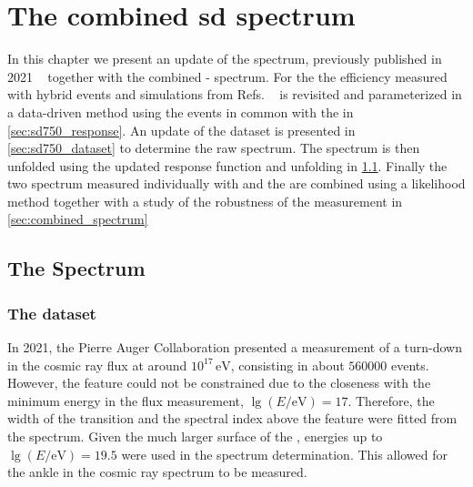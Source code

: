 \documentclass[main.tex]{subfiles}
\begin{document}
\chapter{The combined \gls{sd} spectrum}
\label{chapter:sd750_combined_spectrum}

In this chapter we present an update of the  spectrum, previously published in 2021 ~\cite{PierreAuger:2021:InfillSpectrum} together with the combined - spectrum.
For the  the efficiency measured with hybrid events and simulations from Refs. ~\cite{PierreAuger:2021:InfillSpectrum,Coleman:2020:Thesis} is revisited and parameterized in a data-driven method using the events in common with the  in \cref{sec:sd750_response}.
An update of the dataset is presented in \cref{sec:sd750_dataset} to determine the raw spectrum.
The spectrum is then unfolded using the updated response function and unfolding in \cref{sec:sd750_spectrum}.
Finally the two spectrum measured individually with  and the  are combined using a likelihood method together with a study of the robustness of the measurement in \cref{sec:combined_spectrum}

\section{The  Spectrum}
\label{sec:sd750_spectrum}

\subsection{The  dataset}

In 2021, the Pierre Auger Collaboration presented a measurement of a turn-down in the cosmic ray flux at around $10^{17}\,\mathrm{eV}$, consisting in about $\num{560000}$ events.
However, the feature could not be constrained due to the closeness with the minimum energy in the flux measurement, $\lg(E/\mathrm{eV})=17$.
Therefore, the width of the transition and the spectral index above the feature were fitted from the spectrum.
Given the much larger surface of the , energies up to $\lg(E/\mathrm{eV})=19.5$ were used in the spectrum determination.
This allowed for the ankle in the cosmic ray spectrum to be measured.
\end{document}

